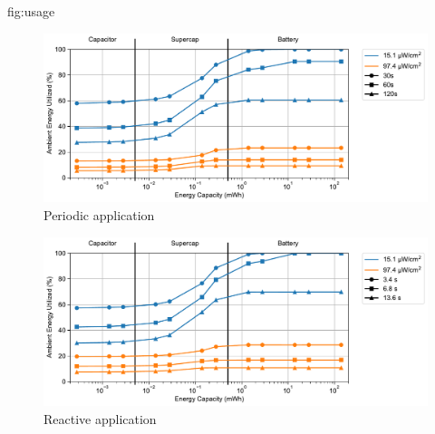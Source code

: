 \begin{definefigure*}{fig:usage}
  \centering
  \begin{subfigure}{\columnwidth}
    \centering
    \includegraphics[width=\linewidth]{figs/capacity/sense_and_send/usage_reliability_v_secondary_capacity/usage_vs_secondary_size.pdf}
    \caption{Periodic application}
    \label{fig:usage:sensesec}
  \end{subfigure}
  \begin{subfigure}{\columnwidth}
    \centering
    \includegraphics[width=\linewidth]{figs/capacity/door_occupancy/usage_vs_secondary_size}
    \caption{Reactive application}
    \label{fig:usage:eventsec}
  \end{subfigure}
  \caption{\normalfont Ambient energy utilization
    as a function of idealized secondary storage capacity for different
    harvesting scenarios and workloads. The harvesting scenarios and workloads
    are described in \cref{tab:capacity:rep}.
     represents the energy utilized by a periodic sense and send application, while \cref{fig:usage:eventsec} is the energy utilized by a event-driven application.
    Despite these two workloads exhibiting different event distributions and variance, the overall energy utilization follows the same trend with energy capacity. 
    As energy storage increases, the harvestable energy used in
    the application also increases. %
    Some scenarios, such as the periodic
    30\,s, 15.1\,\uW/cm\textsuperscript{2} case, reach 100\% utilization at
    sufficient secondary capacities indicating that all of the available energy is captured and may not
    be enough to meet the application's requirements.
    Generally, for both workloads and irradiance traces, from
    the smallest to largest capacity simulated, we see a 1.4-2.3x increase in
    utilized energy.
    }
\end{definefigure*}

